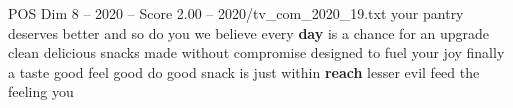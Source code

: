 \begin{textsample}{POS Dim 8 – 2020 – Score 2.00 – 2020/tv\_com\_2020\_19.txt}  \label{ex:f8_pos_025}
your pantry deserves better and so do you we believe every \textbf{day} is a chance for an upgrade clean delicious snacks made without compromise designed to fuel your joy finally a taste good feel good do good snack is just within \textbf{reach} lesser evil feed the feeling you

\end{textsample}
